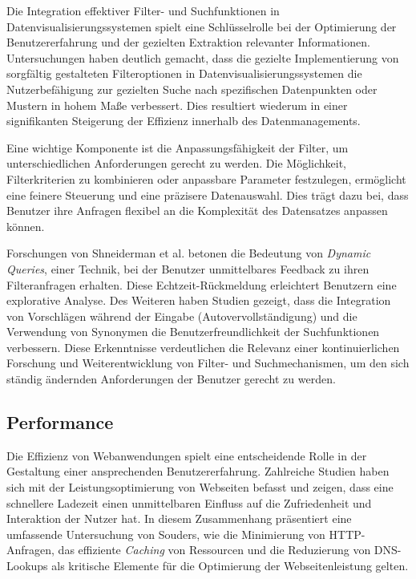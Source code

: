Die Integration effektiver Filter- und Suchfunktionen in Datenvisualisierungssystemen spielt eine Schlüsselrolle bei der Optimierung der Benutzererfahrung und der gezielten Extraktion relevanter Informationen. Untersuchungen haben deutlich gemacht, dass die gezielte Implementierung von sorgfältig gestalteten Filteroptionen in Datenvisualisierungssystemen die Nutzerbefähigung zur gezielten Suche nach spezifischen Datenpunkten oder Mustern in hohem Maße verbessert. Dies resultiert wiederum in einer signifikanten Steigerung der Effizienz innerhalb des Datenmanagements. \cite{morville2010search}

Eine wichtige Komponente ist die Anpassungsfähigkeit der Filter, um unterschiedlichen Anforderungen gerecht zu werden. Die Möglichkeit, Filterkriterien zu kombinieren oder anpassbare Parameter festzulegen, ermöglicht eine feinere Steuerung und eine präzisere Datenauswahl. Dies trägt dazu bei, dass Benutzer ihre Anfragen flexibel an die Komplexität des Datensatzes anpassen können. \cite{shneiderman1996eyes}

Forschungen von Shneiderman et al. betonen die Bedeutung von \emph{Dynamic Queries}, einer Technik, bei der Benutzer unmittelbares Feedback zu ihren Filteranfragen erhalten. Diese Echtzeit-Rückmeldung erleichtert Benutzern eine explorative Analyse. Des Weiteren haben Studien gezeigt, dass die Integration von Vorschlägen während der Eingabe (Autovervollständigung) und die Verwendung von Synonymen die Benutzerfreundlichkeit der Suchfunktionen verbessern. Diese Erkenntnisse verdeutlichen die Relevanz einer kontinuierlichen Forschung und Weiterentwicklung von Filter- und Suchmechanismen, um den sich ständig ändernden Anforderungen der Benutzer gerecht zu werden. \cite{morville2010search,ahlberg1992dynamic}

\subsection{Performance}

Die Effizienz von Webanwendungen spielt eine entscheidende Rolle in der Gestaltung einer ansprechenden Benutzererfahrung. Zahlreiche Studien haben sich mit der Leistungsoptimierung von Webseiten befasst und zeigen, dass eine schnellere Ladezeit einen unmittelbaren Einfluss auf die Zufriedenheit und Interaktion der Nutzer hat. In diesem Zusammenhang präsentiert eine umfassende Untersuchung von Souders, wie die Minimierung von HTTP-Anfragen, das effiziente \emph{Caching} von Ressourcen und die Reduzierung von DNS-Lookups als kritische Elemente für die Optimierung der Webseitenleistung gelten. \cite{souders2008high}


